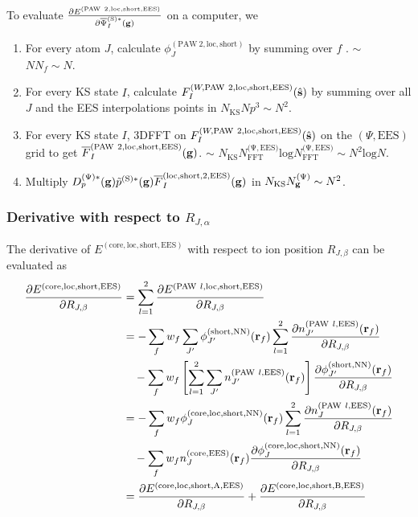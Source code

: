 \documentclass[paper=a4, fontsize=11pt]{article} %
\numberwithin{equation}{section} %
\numberwithin{figure}{section} %
\numberwithin{table}{section} %
\newcommand{\p}{\partial}
\newcommand{\ol}{\overline}
\newcommand{\bg}{{\bf{g}}}
\newcommand{\br}{{\bf{r}}}
\newcommand{\hs}{{\hat{\bf{s}}}}
\newcommand{\rS}{{\mathrm{S}}}
\newcommand{\rEES}{{\mathrm{EES}}}
\newcommand{\rcore}{{\mathrm{core}}}
\newcommand{\rNN}{{\mathrm{NN}}}
\newcommand{\rshort}{{\mathrm{short}}}
\newcommand{\rP}{{\mathrm{PAW}}}
\newcommand{\rA}{{\mathrm{A}}}
\newcommand{\rB}{{\mathrm{B}}}
\newcommand{\rlo}{{\mathrm{loc}}}
\newcommand{\rl}{{\mathrm{log}}}
\newcommand{\psigsc}{{\overline \Psi_I^{(\rS)*}(\bg)}}
\newcommand{\RJa}{{R_{J,\alpha}}}
\newcommand{\RJb}{{R_{J,\beta}}}
\newcommand{\NKS}{{N_{\mathrm{KS}}}}
\newcommand{\NFFTpEES}{{N^{\mathrm{(\Psi,\rEES})}_{\mathrm{FFT}}}}
\newcommand{\Ngp}{{N^{\mathrm{(\Psi})}_\bg}}
\newcommand{\Dpgc}{{D^{(\Psi)*}_p(\bg)}}
\begin{document}
To evaluate $\frac{\p E^{(\rP\ 2,\rlo,\rshort,\rEES)}}{\p \psigsc}$ on a computer, we
\begin{enumerate}
\item For every atom $J$, calculate $\phi_J^{(\rP\ 2,\rlo,\rshort)}$ by summing over $f$ . $\sim$ $NN_f \sim N$.
\item For every KS state $I$, calculate $F_I^{(W,\rP\ 2,\rlo,\rshort,\rEES)}(\hs)$ by summing over all $J$ and the EES interpolations points in $\NKS Np^3 \sim N^2$.
\item For every KS state $I$, 3DFFT on $F_I^{(W,\rP\ 2,\rlo,\rshort,\rEES)}(\hs)$ on the $(\Psi,\rEES)$ grid to get $\ol F_I^{(\rP\ 2,\rlo,\rshort,\rEES)}(\bg)$. $\sim$ $\NKS \NFFTpEES \rl \NFFTpEES \sim N^2 \rl N$.
\item Multiply $\Dpgc \tilde p^{(\rS)*}(\bg) \ol F_I^{(\rlo,\rshort,2,\rEES)}(\bg)$ in $\NKS \Ngp \sim N^2$.
\end{enumerate}








\subsubsection{Derivative with respect to $\RJa$}
The derivative of $E^{(\rcore,\rlo,\rshort,\rEES)}$ with respect to ion position $\RJb$ can be evaluated as
\begin{equation}\label{eq:dElocshortdR}
\begin{split}
\frac{\p E^{(\rcore,\rlo,\rshort,\rEES)} }{\p \RJb} &=
\sum_{l=1}^2\frac{\p E^{(\rP\ l,\rlo,\rshort,\rEES)} }{\p \RJb}\\
&= - \sum_f w_f \sum_{J'} \phi_{J'}^{(\rshort,\rNN)}(\br_f)\sum_{l=1}^2\frac{\p n_{J'}^{(\rP\ l,\rEES)}(\br_f)}{\p \RJb} \\
&\ \ \ - \sum_f w_f \left[\sum_{l=1}^2 \sum_{J'} n_{J'}^{(\rP\ l,\rEES)}(\br_f)\right]\frac{\p \phi_{J'}^{(\rshort,\rNN)}(\br_f)}{\p \RJb}\\
&= - \sum_f w_f \phi_J^{(\rcore,\rlo,\rshort,\rNN)}(\br_f)\sum_{l=1}^2\frac{\p n_{J}^{(\rP\ l,\rEES)}(\br_f)}{\p \RJb} \\
&\ \ \ - \sum_f w_f  n_{J}^{(\rcore,\rEES)}(\br_f) \frac{\p \phi_J^{(\rcore,\rlo,\rshort,\rNN)}(\br_f)}{\p \RJb} \\
&= \frac{\p E^{(\rcore,\rlo,\rshort,\rA,\rEES)}}{\p \RJb}+\frac{\p E^{(\rcore,\rlo,\rshort,\rB,\rEES)}}{\p \RJb}
\end{split}
\end{equation}
\end{document}
